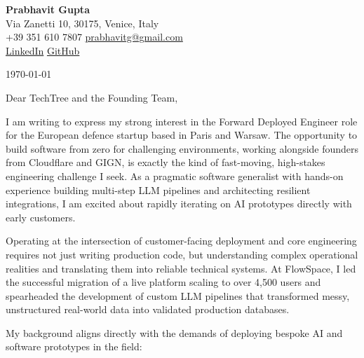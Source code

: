\documentclass[11pt,a4paper]{article}
\begin{document}
\begin{center}
    {\huge \textbf{Prabhavit Gupta}} \\
    \vspace{4pt}
    Via Zanetti 10, 30175, Venice, Italy \\
    +39 351 610 7807 \textbar{} \href{mailto:prabhavitg@gmail.com}{prabhavitg@gmail.com} \\
    \href{https://www.linkedin.com/in/prabhavit/}{LinkedIn} \textbar{} \href{https://github.com/prab-gupta}{GitHub}
\end{center}

\vspace{20pt}

\noindent \today

\vspace{10pt}

\noindent Dear TechTree and the Founding Team,

\vspace{10pt}

\noindent I am writing to express my strong interest in the Forward Deployed Engineer role for the European defence startup based in Paris and Warsaw. The opportunity to build software from zero for challenging environments, working alongside founders from Cloudflare and GIGN, is exactly the kind of fast-moving, high-stakes engineering challenge I seek. As a pragmatic software generalist with hands-on experience building multi-step LLM pipelines and architecting resilient integrations, I am excited about rapidly iterating on AI prototypes directly with early customers.

\noindent Operating at the intersection of customer-facing deployment and core engineering requires not just writing production code, but understanding complex operational realities and translating them into reliable technical systems. At FlowSpace, I led the successful migration of a live platform scaling to over 4,500 users and spearheaded the development of custom LLM pipelines that transformed messy, unstructured real-world data into validated production databases.

\noindent My background aligns directly with the demands of deploying bespoke AI and software prototypes in the field:
\end{document}
